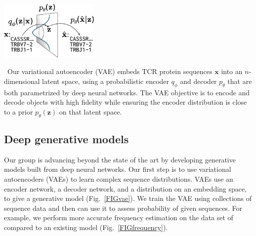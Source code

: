 \documentclass[nobib]{tufte-handout}
\begin{document}
\begin{marginfigure}[0.1in]%
\begin{centering}
    \includegraphics[width=1.9in]{figures/vae.pdf}
\end{centering}
  \caption{\
    Our variational autoencoder (VAE) embeds TCR protein sequences $\mathbf{x}$ into an $n$-dimensional latent space, using a probabilistic encoder $q_\phi$ and decoder $p_\theta$ that are both parametrized by deep neural networks.
The VAE objective is to encode and decode objects with high fidelity while ensuring the encoder distribution is close to a prior $p_\theta(\mathbf{z})$ on that latent space.
    }
  \label{FIGvae}
\end{marginfigure}%



\subsection*{Deep generative models}
Our group is advancing beyond the state of the art by developing generative models built from deep neural networks.
Our first step is to use variational autoencoders (VAEs) \cite{Kingma2014-mo} to learn complex sequence distributions.
VAEs use an encoder network, a decoder network, and a distribution on an embedding space, to give a generative model (Fig.~\ref{FIGvae}).
We train the VAE using collections of sequence data and then can use it to assess probability of given sequences.
For example, we perform more accurate frequency estimation on the data set of \cite{Emerson2017-co} compared to an existing model (Fig.~\ref{FIGfrequency}).
\end{document}
